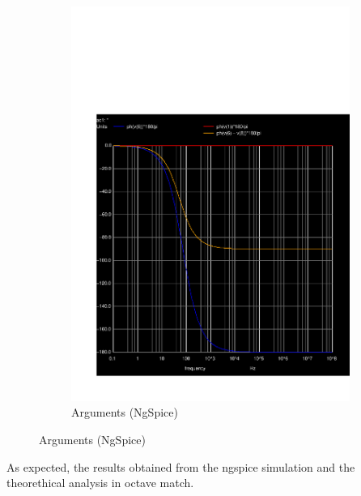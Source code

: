 \begin{figure}[H]
\begin{subfigure}{0.42\textwidth}
\includegraphics[width=\textwidth]{sim5_ph.pdf}
\caption{Arguments (NgSpice)}
\label{fig:second}
\end{subfigure}
\end{figure}

As expected, the results obtained from the ngspice simulation and the theorethical analysis in octave match.

